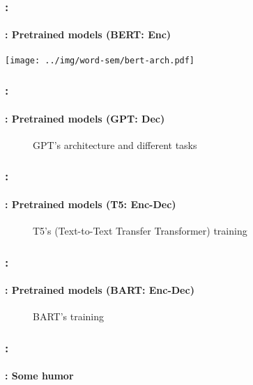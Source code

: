 \documentclass[xcolor=table]{beamer}
\begin{document}
\begin{frame}
	\frametitle{\insertshortsubtitle: \insertsection}
	\framesubtitle{\insertsubsection: Pretrained models (BERT: Enc) \cite{devlin-etal-2019-bert}}
	\begin{center}
		\texttt{[image: ../img/word-sem/bert-arch.pdf]}
	\end{center}
\end{frame}

\begin{frame}
	\frametitle{\insertshortsubtitle: \insertsection}
	\framesubtitle{\insertsubsection: Pretrained models (GPT: Dec) \cite{radford2018improving}}
	\begin{figure}[htbp]
		\caption{GPT's architecture and different tasks \cite{radford2018improving}}
	\end{figure}
\end{frame}

\begin{frame}
	\frametitle{\insertshortsubtitle: \insertsection}
	\framesubtitle{\insertsubsection: Pretrained models (T5: Enc-Dec) \cite{T5}}
	\begin{figure}[htbp]
		\caption{T5's (Text-to-Text Transfer Transformer) training \cite{T5}}
	\end{figure}
\end{frame}

\begin{frame}
	\frametitle{\insertshortsubtitle: \insertsection}
	\framesubtitle{\insertsubsection: Pretrained models (BART: Enc-Dec) \cite{bart}}
	\begin{figure}[htbp]
		\centering
		\caption{BART's training \cite{bart}}
	\end{figure}
\end{frame}


\begin{frame}
	\frametitle{\insertshortsubtitle: \insertsection}
	\framesubtitle{\insertsubsection: Some humor}
	\begin{center}
	\end{center}
\end{frame}


	
\end{document}
